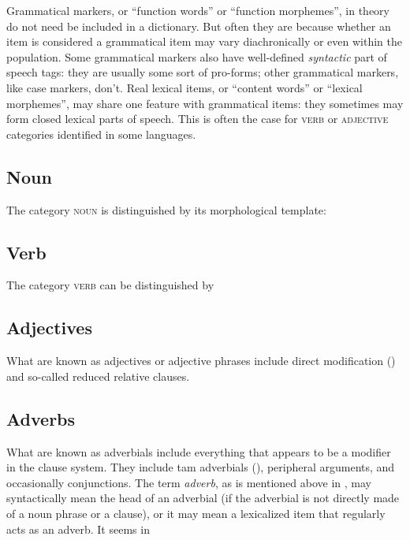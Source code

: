 \documentclass[a4paper, oneside, 12pt]{report}
\newcommand*{\term}[1]{\emph{#1}}
\newcommand*{\category}[1]{\textsc{#1}}
\begin{document}
Grammatical markers, or ``function words'' or ``function morphemes'',
in theory do not need be included in a dictionary.
But often they are because whether an item is considered a grammatical item may vary
diachronically or even within the population.
Some grammatical markers also have well-defined \emph{syntactic} part of speech tags:
they are usually some sort of pro-forms;
other grammatical markers, like case markers, don't.
Real lexical items, or ``content words'' or ``lexical morphemes'',
may share one feature with grammatical items:
they sometimes may form closed lexical parts of speech.
This is often the case for \category{verb} or \category{adjective} categories identified in some languages.

\subsection{Noun}

The category \category{noun} is distinguished by its morphological template:

\subsection{Verb}

The category \category{verb} can be distinguished by 

\subsection{Adjectives}\label{sec:grammatical.pos.adjective}

What are known as adjectives or adjective phrases include direct modification
()
and so-called reduced relative clauses.

\subsection{Adverbs}

What are known as adverbials include everything that appears to be a modifier in the clause system.
They include \ac{tam} adverbials (),
peripheral arguments,
and occasionally conjunctions.
The term \term{adverb}, as is mentioned above in ,
may syntactically mean the head of an adverbial (if the adverbial is not directly made of a noun phrase or a clause),
or it may mean a lexicalized item that regularly acts as an adverb.
It seems in 
\end{document}
